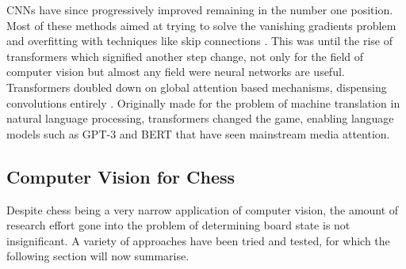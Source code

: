 CNNs have since progressively improved remaining in the number one position.  Most of these methods aimed at trying to solve the vanishing gradients problem \cite{hochreiter1998vanishing}
and overfitting with techniques like skip connections \cite{he2016deep}.
This was until the rise of transformers which signified another step change, not only for the field of computer vision but almost any field
were neural networks are useful.
Transformers doubled down on global attention based mechanisms, dispensing convolutions entirely \cite{vaswani2017attention}.
Originally made for the problem of machine translation in natural language processing, transformers changed the game, enabling language models such as GPT-3 \cite{radford2019language}
and BERT \cite{devlin2018bert} that have seen mainstream media attention.





\subsection{Computer Vision for Chess}
Despite chess being a very narrow application of computer vision, the amount of research effort gone into the problem of determining
board state is not insignificant.
A variety of approaches have been tried and tested, for which the following section will now summarise.

